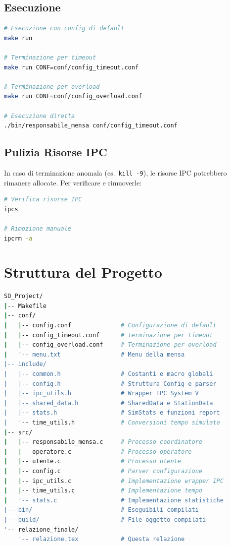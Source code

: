 \documentclass[a4paper,12pt]{article}
\begin{document}
\subsection{Esecuzione}

\begin{lstlisting}[language=bash, caption={Esecuzione con configurazione specifica.}]
# Esecuzione con config di default
make run

# Terminazione per timeout
make run CONF=conf/config_timeout.conf

# Terminazione per overload
make run CONF=conf/config_overload.conf

# Esecuzione diretta
./bin/responsabile_mensa conf/config_timeout.conf
\end{lstlisting}

\subsection{Pulizia Risorse IPC}

In caso di terminazione anomala (es.\ \texttt{kill -9}), le risorse
IPC potrebbero rimanere allocate. Per verificare e rimuoverle:

\begin{lstlisting}[language=bash, caption={Pulizia risorse IPC residue.}]
# Verifica risorse IPC
ipcs

# Rimozione manuale
ipcrm -a
\end{lstlisting}

\section{Struttura del Progetto}

\begin{lstlisting}[language=bash, caption={Struttura della directory del progetto.}]
SO_Project/
|-- Makefile
|-- conf/
|   |-- config.conf              # Configurazione di default
|   |-- config_timeout.conf      # Terminazione per timeout
|   |-- config_overload.conf     # Terminazione per overload
|   '-- menu.txt                 # Menu della mensa
|-- include/
|   |-- common.h                 # Costanti e macro globali
|   |-- config.h                 # Struttura Config e parser
|   |-- ipc_utils.h              # Wrapper IPC System V
|   |-- shared_data.h            # SharedData e StationData
|   |-- stats.h                  # SimStats e funzioni report
|   '-- time_utils.h             # Conversioni tempo simulato
|-- src/
|   |-- responsabile_mensa.c     # Processo coordinatore
|   |-- operatore.c              # Processo operatore
|   |-- utente.c                 # Processo utente
|   |-- config.c                 # Parser configurazione
|   |-- ipc_utils.c              # Implementazione wrapper IPC
|   |-- time_utils.c             # Implementazione tempo
|   '-- stats.c                  # Implementazione statistiche
|-- bin/                         # Eseguibili compilati
|-- build/                       # File oggetto compilati
'-- relazione_finale/
    '-- relazione.tex            # Questa relazione
\end{lstlisting}
\end{document}
